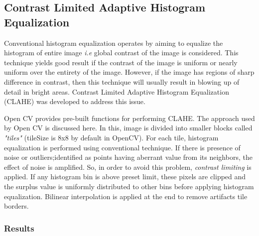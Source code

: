\documentclass[12pt, a4paper, font = Times New Roman]{article}
\begin{document}
\clearpage
\newpage
\subsection{Contrast Limited Adaptive Histogram Equalization}

\par
Conventional histogram equalization operates by aiming to equalize the histogram of entire image \emph{i.e} global contrast of the image is considered. This technique yields good result if the contrast of the image is uniform or nearly uniform over the entirety of the image. However, if the image has regions of sharp difference in contrast, then this technique will usually result in blowing up of detail in bright areas. Contrast Limited Adaptive Histogram Equalization (CLAHE) was developed to address this issue.
\par
Open CV provides pre-built functions for performing CLAHE. The approach used by Open CV is discussed here. In this, image is divided into smaller blocks called \emph{"tiles"} (tileSize is 8x8 by default in OpenCV). For each tile, histogram equalization is performed using conventional technique. If there is presence of noise or outliers;identified as points having aberrant value from its neighbors, the effect of noise is amplified. So, in order to avoid this problem, \emph{contrast limiting} is applied. If any histogram bin is above preset limit, these pixels are clipped and the surplus value is uniformly distributed to other bins before applying histogram equalization. Bilinear interpolation is applied at the end to remove artifacts tile borders.

\subsubsection{Results}
\end{document}
